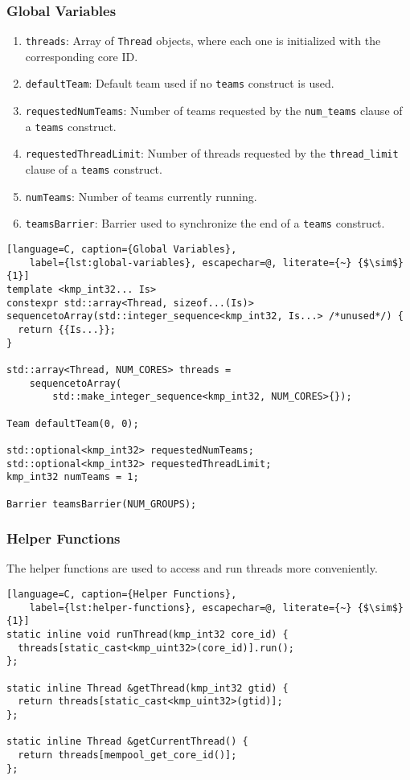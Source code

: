 \subsubsection{Global Variables}

\begin{enumerate}
	\item \texttt{threads}: Array of \texttt{Thread} objects, where each one is initialized with the
	      corresponding core ID.
	\item \texttt{defaultTeam}: Default team used if no \texttt{teams} construct is used.
	\item \texttt{requestedNumTeams}: Number of teams requested by the \texttt{num\_teams} clause
	      of a \texttt{teams} construct.
	\item \texttt{requestedThreadLimit}: Number of threads requested by the \texttt{thread\_limit}
	      clause of a \texttt{teams} construct.
	\item \texttt{numTeams}: Number of teams currently running.
	\item \texttt{teamsBarrier}: Barrier used to synchronize the end of a \texttt{teams} construct.
\end{enumerate}

\begin{lstlisting}[language=C, caption={Global Variables},
	label={lst:global-variables}, escapechar=@, literate={~} {$\sim$}{1}]
template <kmp_int32... Is>
constexpr std::array<Thread, sizeof...(Is)>
sequencetoArray(std::integer_sequence<kmp_int32, Is...> /*unused*/) {
  return {{Is...}};
}

std::array<Thread, NUM_CORES> threads =
    sequencetoArray(
        std::make_integer_sequence<kmp_int32, NUM_CORES>{});

Team defaultTeam(0, 0);

std::optional<kmp_int32> requestedNumTeams;
std::optional<kmp_int32> requestedThreadLimit;
kmp_int32 numTeams = 1;

Barrier teamsBarrier(NUM_GROUPS);
\end{lstlisting}

\subsubsection{Helper Functions}

The helper functions are used to access and run threads more conveniently.

\begin{lstlisting}[language=C, caption={Helper Functions},
	label={lst:helper-functions}, escapechar=@, literate={~} {$\sim$}{1}]
static inline void runThread(kmp_int32 core_id) {
  threads[static_cast<kmp_uint32>(core_id)].run();
};

static inline Thread &getThread(kmp_int32 gtid) {
  return threads[static_cast<kmp_uint32>(gtid)];
};

static inline Thread &getCurrentThread() {
  return threads[mempool_get_core_id()];
};
\end{lstlisting}

